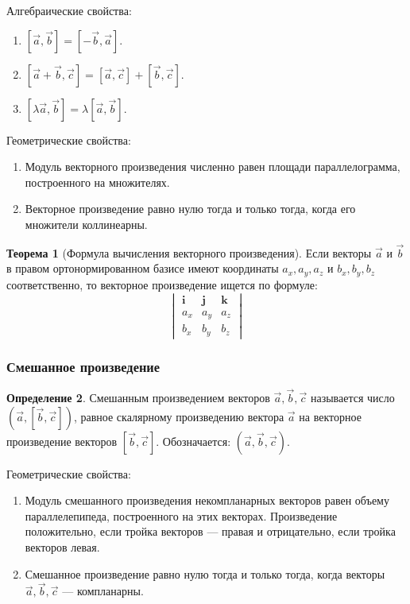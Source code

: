 \documentclass[12pt]{report}
\theoremstyle{definition}
\newtheorem{theorem}{Теорема}[chapter]
\newtheorem{definition}[theorem]{Определение}
\begin{document}
Алгебраические свойства:
\begin{enumerate}
\item $[\vec{a}, \vec{b}] = [-\vec{b}, \vec{a}]$.
\item $[\vec{a} + \vec{b}, \vec{c}] = [\vec{a}, \vec{c}] + [\vec{b}, \vec{c}]$.
\item $[\lambda \vec{a}, \vec{b}] = \lambda [\vec{a}, \vec{b}]$.
\end{enumerate}

Геометрические свойства:
\begin{enumerate}
\item Модуль векторного произведения численно равен площади параллелограмма,
  построенного на множителях.
\item Векторное произведение равно нулю тогда и только тогда, когда
  его множители коллинеарны.
\end{enumerate}

\begin{theorem}[Формула вычисления векторного произведения]
Если векторы $\vec{a}$ и $\vec{b}$ в правом ортонормированном базисе
имеют координаты $a_x, a_y, a_z$ и $b_x, b_y, b_z$ соответственно,
то векторное произведение ищется по формуле:
$$
\begin{vmatrix}
\mathbf i & \mathbf j & \mathbf k \\
a_x & a_y & a_z \\ 
b_x & b_y & b_z 
\end{vmatrix}
$$ 
\end{theorem}

\subsubsection{Смешанное произведение}
\begin{definition}
Смешанным произведением векторов $\vec{a}, \vec{b}, \vec{c}$ называется число
$(\vec{a}, [\vec{b}, \vec{c}])$, равное скалярному произведению вектора $\vec{a}$
на векторное произведение векторов $[\vec{b}, \vec{c}]$.
Обозначается: $(\vec{a}, \vec{b}, \vec{c})$.
\end{definition}

Геометрические свойства:
\begin{enumerate}
\item Модуль смешанного произведения некомпланарных векторов
  равен объему параллелепипеда, построенного на этих векторах.
  Произведение положительно, если тройка векторов --- правая и
  отрицательно, если тройка векторов левая.
\item Смешанное произведение равно нулю тогда и только тогда, когда векторы
  $\vec{a}, \vec{b}, \vec{c}$ --- компланарны.
\end{enumerate}
\end{document}

